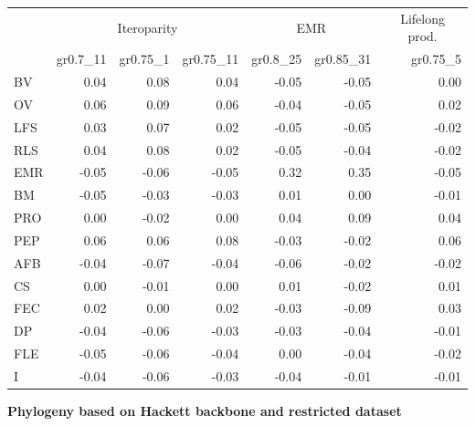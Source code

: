 \begin{landscape}
\begin{table}
\begin{footnotesize}
\begin{tabular}{@{}l|rrr|rr|r@{}}
\toprule
 & \multicolumn{3}{c|}{Iteroparity} & \multicolumn{2}{c|}{EMR} & \multicolumn{1}{c}{Lifelong prod.}\\
 & gr0.7\_11 & gr0.75\_1 & gr0.75\_11 & gr0.8\_25 & gr0.85\_31 & gr0.75\_5\\
\midrule
BV & 0.04 & 0.08 & 0.04 & -0.05 & -0.05 & 0.00\\
OV & 0.06 & 0.09 & 0.06 & -0.04 & -0.05 & 0.02\\
LFS & 0.03 & 0.07 & 0.02 & -0.05 & -0.05 & -0.02\\
RLS & 0.04 & 0.08 & 0.02 & -0.05 & -0.04 & -0.02\\
EMR & -0.05 & -0.06 & -0.05 & 0.32 & 0.35 & -0.05\\
BM & -0.05 & -0.03 & -0.03 & 0.01 & 0.00 & -0.01\\
PRO & 0.00 & -0.02 & 0.00 & 0.04 & 0.09 & 0.04\\
PEP & 0.06 & 0.06 & 0.08 & -0.03 & -0.02 & 0.06\\
AFB & -0.04 & -0.07 & -0.04 & -0.06 & -0.02 & -0.02\\
CS & 0.00 & -0.01 & 0.00 & 0.01 & -0.02 & 0.01\\
FEC & 0.02 & 0.00 & 0.02 & -0.03 & -0.09 & 0.03\\
DP & -0.04 & -0.06 & -0.03 & -0.03 & -0.04 & -0.01\\
FLE & -0.05 & -0.06 & -0.04 & 0.00 & -0.04 & -0.02\\
I & -0.04 & -0.06 & -0.03 & -0.04 & -0.01 & -0.01\\
\bottomrule
\end{tabular}

\textbf{Phylogeny based on Hackett backbone and restricted dataset}


\end{footnotesize}
\end{table}
\end{landscape}

